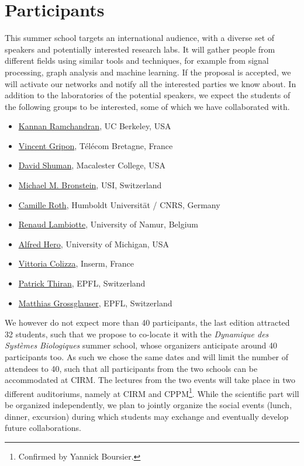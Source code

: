 \documentclass[a4paper]{scrartcl}
\begin{document}
\section{Participants}

This summer school targets an international audience, with a diverse set of
speakers and potentially interested research labs. It will gather people from
different fields using similar tools and techniques, for example from signal
processing, graph analysis and machine learning. If the proposal is accepted, we
will activate our networks and notify all the interested parties we know about.
In addition to the laboratories of the potential speakers, we expect the
students of the following groups to be interested, some of which we have
collaborated with.
\begin{itemize}
	\setlength{\itemsep}{0pt} \setlength{\parskip}{0pt}
	\item \href{https://www.eecs.berkeley.edu/~kannanr/}
		{Kannan Ramchandran}, UC Berkeley, USA
	\item \href{http://www.vincent-gripon.com/}
		{Vincent Gripon}, Télécom Bretagne, France
	\item \href{http://www.macalester.edu/~dshuman1/}
		{David Shuman}, Macalester College, USA
	\item \href{http://www.inf.usi.ch/bronstein/}
		{Michael M. Bronstein}, USI, Switzerland
	\item \href{http://camille.roth.free.fr/index.php}
		{Camille Roth}, Humboldt Universität / CNRS, Germany
	\item \href{http://xn.unamur.be/}
		{Renaud Lambiotte}, University of Namur, Belgium
	\item \href{https://web.eecs.umich.edu/~hero/}
		{Alfred Hero}, University of Michigan, USA
	\item \href{http://www.epicx-lab.com/vittoria-colizza.html}
		{Vittoria Colizza}, Inserm, France
	\item \href{http://people.epfl.ch/patrick.thiran}
		{Patrick Thiran}, EPFL, Switzerland
	\item \href{http://icapeople.epfl.ch/grossglauser/}
		{Matthias Grossglauser}, EPFL, Switzerland
\end{itemize}

We however do not expect more than 40 participants, the last edition attracted
32 students, such that we propose to co-locate it with the \textit{Dynamique des
Systèmes Biologiques} summer school, whose organizers anticipate around 40
participants too. As such we chose the same dates and will limit the number of
attendees to 40, such that all participants from the two schools can be
accommodated at CIRM. The lectures from the two events will take place in two
different auditoriums, namely at CIRM and CPPM\footnote{Confirmed by Yannick
Boursier.}. While the scientific part will be organized independently, we plan
to jointly organize the social events (lunch, dinner, excursion) during which
students may exchange and eventually develop future collaborations.
\end{document}
